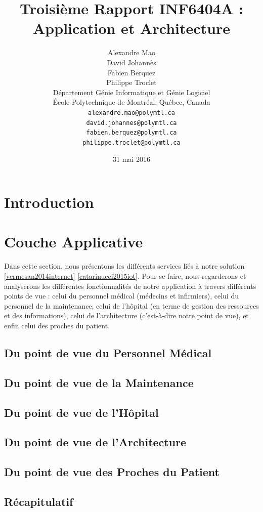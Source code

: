 \documentclass{article}
\title{Troisième Rapport INF6404A : Application et Architecture}
\author{
	Alexandre Mao\\
	David Johannès \\
	Fabien Berquez \\
	Philippe Troclet \\
	D\'{e}partement G\'{e}nie Informatique et G\'{e}nie Logiciel \\
	\'{E}cole Polytechnique de Montr\'{e}al, Qu\'{e}bec, Canada \\
	\texttt{alexandre.mao@polymtl.ca}\\
	\texttt{david.johannes@polymtl.ca}\\
	\texttt{fabien.berquez@polymtl.ca}   \\
	\texttt{philippe.troclet@polymtl.ca}   \\
}
\date{31 mai 2016}
\begin{document}
\maketitle

\section{Introduction}


 
\section{Couche Applicative}
Dans cette section, nous présentons les différents services liés à notre solution \ref{vermesan2014internet} \ref{catarinucci2015iot}. Pour se faire, nous regarderons et analyserons les différentes fonctionnalités de notre application à travers différents points de vue : celui du personnel médical (médecins et infirmiers), celui du personnel de la maintenance, celui de l'hôpital (en terme de gestion des ressources et des informations), celui de l'architecture (c'est-à-dire notre point de vue), et enfin celui des proches du patient.

\subsection{Du point de vue du Personnel Médical}

\subsection{Du point de vue de la Maintenance}

\subsection{Du point de vue de l'Hôpital}

\subsection{Du point de vue de l'Architecture}

\subsection{Du point de vue des Proches du Patient}

\subsection{Récapitulatif}

\end{document}
